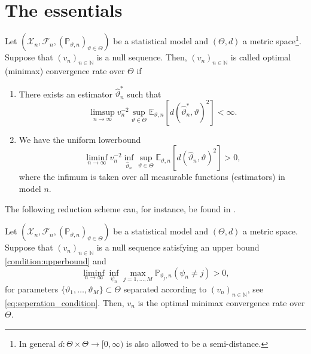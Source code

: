 \documentclass[a4paper]{article}
\begin{document}
\section{The essentials}
\begin{definition}
	Let $(\mathcal{X}_n, \mathcal{F}_n, (\mathbb{P}_{\vartheta,n})_{\vartheta \in \Theta})$ be a statistical model and $(\Theta, d)$ a metric space\footnote{In general $d:\Theta \times \Theta \rightarrow [0,\infty)$ is also allowed to be a semi-distance.}. Suppose that $(v_n)_{n \in \mathbb{N}}$ is a null sequence. Then, $(v_n)_{n \in \mathbb{N}}$ is called optimal (minimax) convergence rate over $\Theta$ if
	\begin{enumerate}
		\item There exists an estimator $\hat{\vartheta}_n^{*}$ such that
		      \begin{equation*}
			      \label{condition:upperbound}
			      \limsup_{n \rightarrow \infty} v_n^{-2} \sup_{\vartheta \in \Theta} \mathbb{E}_{\vartheta, n}[d(\hat{\vartheta}_n^{*}, \vartheta)^{2}]< \infty.
		      \end{equation*}
		\item We have the uniform lowerbound
		      \begin{equation*}
			      \liminf_{n \rightarrow \infty} v_n^{-2} \inf_{\hat{\vartheta}_n} \sup_{\vartheta \in \Theta} \mathbb{E}_{\vartheta,n}[d(\hat{\vartheta}_{n}, \vartheta)^{2}]>0,
		      \end{equation*}
		      where the infimum is taken over all measurable functions (estimators) in model $n$.
	\end{enumerate}
\end{definition}
The following reduction scheme can, for instance, be found in \citet[Chapter 2]{tsybakovIntroductionNonparametricEstimation2009}.
\begin{propositionrep}
	\label{result:reduction_scheme}
	Let $(\mathcal{X}_n, \mathcal{F}_n, (\mathbb{P}_{\vartheta,n})_{\vartheta \in \Theta})$ be a statistical model and $(\Theta, d)$ a metric space. Suppose that $(v_n)_{n \in \mathbb{N}}$ is a null sequence satisfying an upper bound \eqref{condition:upperbound} and
	\begin{equation*}
		\liminf_{n \rightarrow \infty} \inf_{\psi_n} \max_{j=1,\dots,M} \mathbb{P}_{\vartheta_j,n}(\psi_n \neq j)>0,
	\end{equation*}
    for parameters $\{\vartheta_1, \dots, \vartheta_M\} \subset \Theta$ separated according to $(v_n)_{n \in \mathbb{N}}$, see \eqref{eq:seperation_condition}.	Then, $v_n$ is the optimal minimax convergence rate over $\Theta$.
\end{propositionrep}
\end{document}
